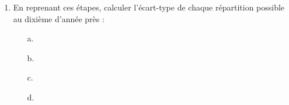 \documentclass[
	classe=$2^{de}$,
	headerTitle=Activité,
	landscape,
	twocolumn
]{exercice}
\begin{document}
{\begin{enumerate}
		      On obtient alors l'\textbf{écart-type}.
		\item En reprenant ces étapes, calculer l'écart-type de chaque répartition possible au dixième d'année près :
		      \begin{multicols}{2}
			      \begin{itemize}
				      \item[a.] 
				      \item[b.] 
				      \item[c.] 
				      \item[d.] 
			      \end{itemize}
		      \end{multicols}
	\end{enumerate}
}

\Activite

\ifdefined\makeCorrection
\else
	\newpage
	\Activite
\fi
\end{document}
